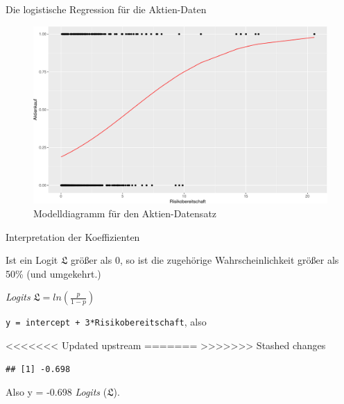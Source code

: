 \begin{frame}{Die logistische Regression für die Aktien-Daten}

\begin{figure}

{\centering \includegraphics[width=0.8\linewidth]{PraDa_Folien_nm_2_files/figure-beamer/aktien-plot-1} 

}

\caption{Modelldiagramm für den Aktien-Datensatz}\label{fig:aktien-plot}
\end{figure}

\end{frame}

\begin{frame}[fragile]{Interpretation der Koeffizienten}

Ist ein Logit \(\mathfrak{L}\) größer als \(0\), so ist die zugehörige
Wahrscheinlichkeit größer als 50\% (und umgekehrt.)

\emph{Logits}
\(\mathfrak{L} = ln\left( \frac{p}{1-p} \right)\)

\texttt{y\ =\ intercept\ +\ 3*Risikobereitschaft}, also

\begin{Shaded}
\begin{Highlighting}[]
<<<<<<< Updated upstream
\StringTok{ }\OperatorTok{-} \OperatorTok{+}\StringTok{ } \OperatorTok{*}\StringTok{ }\NormalTok{)}
=======
\StringTok{ }\NormalTok{-} \NormalTok{+}\StringTok{ } \NormalTok{*}\StringTok{ }\NormalTok{)}
>>>>>>> Stashed changes
\end{Highlighting}
\end{Shaded}

\begin{verbatim}
## [1] -0.698
\end{verbatim}

Also y = -0.698 \emph{Logits} (\(\mathfrak{L}\)).

\end{frame}

